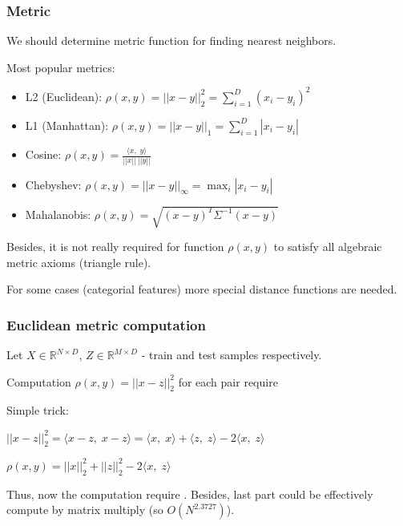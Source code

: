 \documentclass{beamer}
\begin{document}
		\begin{frame}
			\frametitle{Metric}
			
			We should determine metric function for finding nearest neighbors.
			
			Most popular metrics: 
			\begin{itemize}
				\item L2 (Euclidean): $\rho(x, y) = ||x-y||_2^2 = \sum_{i=1}^{D} (x_i - y_i)^2$
				\item L1 (Manhattan): $\rho(x, y) = ||x-y||_1 = \sum_{i=1}^{D} |x_i - y_i|$
				\item Cosine: $\rho(x, y) = \frac{\langle x,\; y \rangle}{||x||\:||y||}$
				\item Chebyshev: $\rho(x, y) = ||x-y||_{\infty} = \max_i |x_i - y_i|$
				\item Mahalanobis: $\rho(x, y) = \sqrt{(x-y)^T\Sigma^{-1}(x-y)}$
			\end{itemize}
		
		Besides, it is not really required for function $\rho(x, y)$ to satisfy all algebraic metric axioms (triangle rule).
		
		For some cases (categorial features) more special distance functions are needed.
			
		\end{frame}
	

		\begin{frame}
			\frametitle{Euclidean metric computation}
			
			Let $X \in \mathbb{R}^{N\times D}$, $Z \in \mathbb{R}^{M\times D}$ - train and test samples respectively.
			
			
			Computation $\rho(x, y) = ||x-z||_2^2$ for each pair require 
			
			Simple trick:
			\begin{center}
		
			
			$||x-z||_2^2 = \langle x-z,\; x-z\rangle = \langle x,\; x\rangle + \langle z,\; z\rangle - 2\langle x,\; z\rangle $ 
			\\ 
			\end{center}
			\begin{center}	
			$\rho(x, y) = ||x||_2^2 + ||z||_2^2 - 2\langle x,\; z\rangle$
			\end{center}
			Thus, now the computation require  . Besides, last part could be effectively compute by matrix multiply (so $O(N^{2.3727})$).
		
		\end{frame}
		
\end{document}
